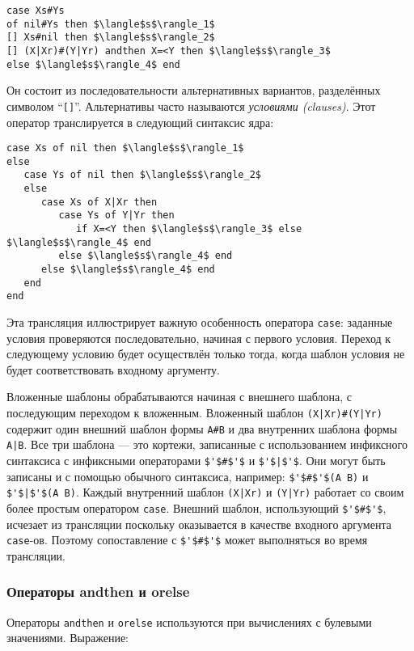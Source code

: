 \begin{lstlisting}
case Xs#Ys
of nil#Ys then $\langle$s$\rangle_1$
[] Xs#nil then $\langle$s$\rangle_2$
[] (X|Xr)#(Y|Yr) andthen X=<Y then $\langle$s$\rangle_3$
else $\langle$s$\rangle_4$ end
\end{lstlisting}

Он состоит из последовательности альтернативных вариантов, разделённых символом ``\lstinline|[]|''. Альтернативы часто называются \emph{условиями (clauses)}. Этот оператор транслируется в следующий синтаксис ядра:

\begin{lstlisting}
case Xs of nil then $\langle$s$\rangle_1$
else
   case Ys of nil then $\langle$s$\rangle_2$
   else
      case Xs of X|Xr then
         case Ys of Y|Yr then
            if X=<Y then $\langle$s$\rangle_3$ else $\langle$s$\rangle_4$ end
         else $\langle$s$\rangle_4$ end
      else $\langle$s$\rangle_4$ end
   end
end
\end{lstlisting}

Эта трансляция иллюстрирует важную особенность оператора \lstinline|case|: заданные условия проверяются последовательно, начиная с первого условия. Переход к следующему условию будет осуществлён только тогда, когда шаблон условия не будет соответствовать входному аргументу.

Вложенные шаблоны обрабатываются начиная с внешнего шаблона, с последующим переходом к вложенным. Вложенный шаблон \lstinline!(X|Xr)#(Y|Yr)! содержит один внешний шаблон формы \lstinline!A#B! и два внутренних шаблона формы \lstinline!A|B!. Все три шаблона --- это кортежи, записанные с использованием инфиксного синтаксиса с инфиксными операторами \lstinline|$'$#$'$| и \lstinline!$'$|$'$!. Они могут быть записаны и с помощью обычного синтаксиса, например: \lstinline!$'$#$'$(A B)! и \lstinline!$'$|$'$(A B)!. Каждый внутренний шаблон  \lstinline!(X|Xr)! и \lstinline!(Y|Yr)! работает со своим более простым оператором \lstinline|case|. Внешний шаблон, использующий \lstinline|$'$#$'$|, исчезает из трансляции поскольку оказывается в качестве входного аргумента \lstinline|case|-ов. Поэтому сопоставление с \lstinline|$'$#$'$|  может выполняться во время трансляции.

\subsubsection{Операторы andthen и orelse}

Операторы \lstinline|andthen| и \lstinline|orelse| используются при вычислениях с булевыми значениями. Выражение:

